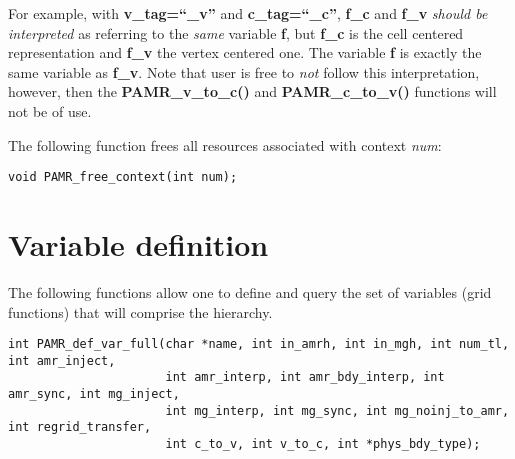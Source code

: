 \documentclass[aps,amssymb,unsortedaddress,nofootinbib]{revtex4}
\def\lsep{\itemsep 0.05in}
\begin{document}
\begin{list}{}{\lsep}
      For example, with {\bf v\_tag=``\_v''} and {\bf c\_tag=``\_c''}, 
      {\bf f\_c} and {\bf f\_v} {\em should be interpreted} as referring to the {\em same} variable {\bf f}, but 
      {\bf f\_c} is the cell centered representation and {\bf f\_v} 
      the vertex centered one. The variable {\bf f} is exactly the same variable
      as {\bf f\_v}. Note that user is free to {\em not} follow this interpretation, however, then the
      {\bf PAMR\_v\_to\_c()} and {\bf PAMR\_c\_to\_v()} functions will not be of use.
\end{list}

\noindent 
The following function frees all resources associated with context {\em num}:


\begin{verbatim}
void PAMR_free_context(int num);
\end{verbatim}


\section{Variable definition}
The following functions allow one to define and query the set of variables (grid functions)
that will comprise the hierarchy.


\begin{verbatim}
int PAMR_def_var_full(char *name, int in_amrh, int in_mgh, int num_tl, int amr_inject,
                      int amr_interp, int amr_bdy_interp, int amr_sync, int mg_inject, 
                      int mg_interp, int mg_sync, int mg_noinj_to_amr, int regrid_transfer, 
                      int c_to_v, int v_to_c, int *phys_bdy_type);
\end{verbatim}
\end{document}
